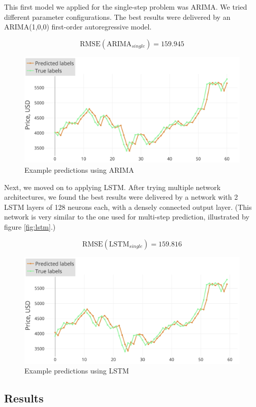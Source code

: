 \documentclass{article}
\begin{document}
This first model we applied for the single-step problem was ARIMA. We tried different parameter configurations. The best results were delivered by an ARIMA(1,0,0) first-order autoregressive model.

$$\textrm{RMSE}(\textrm{ARIMA}_{single}) = 159.945$$

\begin{figure}[h!]
\centering
\includegraphics[width=0.9\columnwidth]{images/single-arima.png}
\caption{Example predictions using ARIMA}
\label{fig:single-arima}
\end{figure}

Next, we moved on to applying LSTM. After trying multiple network architectures, we found the best results were delivered by a network with 2 LSTM layers of 128 neurons each, with a densely connected output layer. (This network is very similar to the one used for multi-step prediction, illustrated by figure \ref{fig:lstm}.)

$$\textrm{RMSE}(\textrm{LSTM}_{single}) = 159.816$$

\begin{figure}[h!]
\centering
\includegraphics[width=0.9\columnwidth]{images/single-lstm-1.png}
\caption{Example predictions using LSTM}
\label{fig:single-lstm}
\end{figure}

\subsection{Results}
\end{document}
